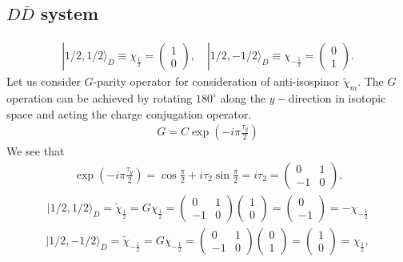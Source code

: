 \documentclass[aps,prd,preprintnumbers,showpacs,showkeys,nofootinbib,
superscriptaddress,fleqn,floatfix,tightenlines, 10pt]{revtex4-1}
\begin{document}
\subsection{$D\bar{D}$ system}
\begin{align}
	|1/2,1/2\rangle_{D} \equiv \chi_{\frac{1}{2}} =
	\left( \begin{array}{c} 1\\0 \end{array} \right),\quad
	|1/2,{-1}/2\rangle_D \equiv \chi_{-\frac{1}{2}} =
	\left( \begin{array}{c} 0\\1 \end{array} \right).
\end{align}
Let us consider $G$-parity operator for consideration of anti-isospinor $\tilde{\chi}_m$.
The $G$ operation can be achieved by rotating $180^{\circ}$ along the $y-$direction in isotopic space and
acting the charge conjugation operator.
\begin{align}
	G = C \exp\left(-i\pi\frac{\tau_y}{2}\right)
\end{align}
We see that
\begin{align}
	\exp\left(-i\pi\frac{\tau_y}{2}\right) = \cos{\frac{\pi}{2}}+i\tau_2\sin{\frac{\pi}{2}} = i\tau_2 =
	\left( \begin{array}{cc} 0&1\\-1&0 \end{array} \right).
\end{align}
\begin{align}
	|1/2,1/2\rangle_{\bar{D}} = \tilde{\chi}_{\frac{1}{2}} = G \chi_{\frac{1}{2}} = \left( \begin{array}{cc} 0&1\\-1&0 \end{array} \right)
	\left( \begin{array}{c} 1\\0 \end{array} \right) = \left( \begin{array}{c} 0\\-1 \end{array} \right) = -\chi_{-\frac{1}{2}}
\end{align}
\begin{align}
	|1/2,-1/2\rangle_{\bar{D}} = \tilde{\chi}_{-\frac{1}{2}} = G \chi_{-\frac{1}{2}} = \left( \begin{array}{cc} 0&1\\-1&0 \end{array} \right)
	\left( \begin{array}{c} 0\\1 \end{array} \right) = \left( \begin{array}{c} 1\\0 \end{array} \right) = \chi_{\frac{1}{2}},
\end{align}
\end{document}
